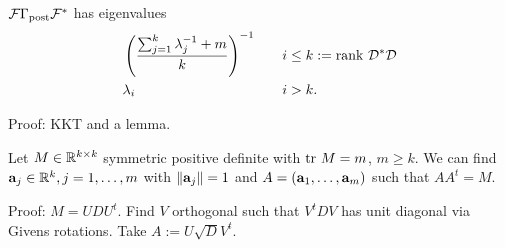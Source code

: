 \documentclass{beamer}
\begin{document}


\begin{frame}
  \begin{theorem}[D.]
    \( \mathcal{F} \Gamma_{\textup{post}} \mathcal{F}^*\)
    has eigenvalues 
    \begin{align*}
      &\left(\frac{\sum_{j=1}^k \lambda_j^{-1} + m}{k} \right )^{-1} &&\quad i \leq k:= \textup{rank}\  \mathcal{D}^*\mathcal{D} \\
      &\lambda_i  &&\quad i > k.
    \end{align*}
  \end{theorem}
  \pause Proof: KKT and a lemma.
\end{frame}

\begin{frame}
  \begin{lemma}[D.]
    Let $M \in \mathbb{R}^{k \times k}$ symmetric positive definite with $\textup{tr}\ M = m$, $m \geq k$. We can find $\mathbf{a}_j \in \mathbb{R}^k,j=1,\dots,m$
    with $\|\mathbf{a}_j\|=1$ and $A = (\mathbf{a}_1,\dots,\mathbf{a}_m)$ such that
    $AA^t = M$.
  \end{lemma}
  \pause Proof: $M = UDU^t$. Find $V$ orthogonal such that $V^tDV$ has
  unit diagonal via Givens rotations. Take $A := U\sqrt{D} V^t$.
\end{frame}
\end{document}
